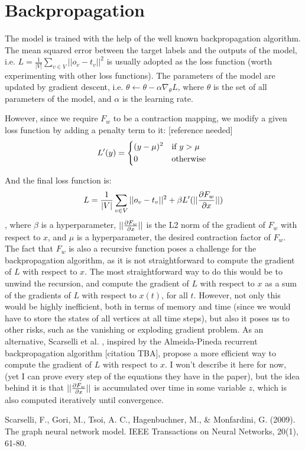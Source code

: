 \documentclass[12pt]{article}
\begin{document}
\section{Backpropagation}

    \indent The model is trained with the help of the well known backpropagation algorithm. The mean squared error between the target labels and the outputs of the model, i.e. $L = \frac{1}{|V|} \sum_{v \in V} ||o_v - t_v||^2$ is usually adopted as the loss function (worth experimenting with other loss functions). The parameters of the model are updated by gradient descent, i.e. $\theta \leftarrow \theta - \alpha \nabla_\theta L$, where $\theta$ is the set of all parameters of the model, and $\alpha$ is the learning rate.
    
    \indent However, since we require $F_w$ to be a contraction mapping, we modify a given loss function by adding a penalty term to it: [reference needed]
    \begin{equation*}    
        L'(y) = 
        \begin{dcases*}
            (y - \mu)^2 & \text{if} $y > \mu$ \\
            0           & \text{otherwise}
        \end{dcases*}
    \end{equation*}

    And the final loss function is:
    \begin{equation}
        L = \frac{1}{|V|} \sum_{v \in V} ||o_v - t_v||^2 + \beta L'(|| {{\partial F_w} \over {\partial x} } ||)
    \end{equation}
    , where $\beta$ is a hyperparameter, $|| {{\partial F_w} \over {\partial x} } ||$ is the L2 norm of the gradient of $F_w$ with respect to $x$, and $\mu$ is a hyperparameter, the desired contraction factor of $F_w$.
    \\

    \indent The fact that $F_w$ is also a recursive function poses a challenge for the backpropagation algorithm, as it is not straightforward to compute the gradient of $L$ with respect to $x$. The most straightforward way to do this would be to unwind the recursion, and compute the gradient of $L$ with respect to $x$ as a sum of the gradients of $L$ with respect to $x(t)$, for all $t$.
    However, not only this would be highly inefficient, both in terms of memory and time (since we would have to store the states of all vertices at all time steps), but also it poses us to other risks, such as the vanishing or exploding gradient problem.
    As an alternative, Scarselli et al. \cite{scarselli2009graph}, inspired by the Almeida-Pineda recurrent backpropagation algorithm [citation TBA], propose a more efficient way to compute the gradient of $L$ with respect to $x$.
    I won't describe it here for now, (yet I can prove every step of the equations they have in the paper),
    but the idea behind it is that $|| {{\partial F_w} \over {\partial x} } ||$ is accumulated over time in some variable $z$, which is also computed iteratively until convergence.
    



\begin{thebibliography}{9}
Scarselli, F., Gori, M., Tsoi, A. C., Hagenbuchner, M., \& Monfardini, G. (2009). The graph neural network model. IEEE Transactions on Neural Networks, 20(1), 61-80.

\end{thebibliography}
\end{document}
